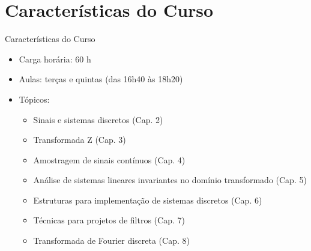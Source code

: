 \documentclass[
size=17pt,
paper=smartboard,
mode=present,
display=slidesnotes,
style=sailor,
nopagebreaks,
blackslide,
fleqn]{powerdot}
\begin{document}
   \section[ slide = false ]{Características do Curso}
      \begin{slide}[toc=]{Características do Curso}
         \begin{itemize}
            \item Carga horária: 60 h
            \item Aulas: terças e quintas (das 16h40 às 18h20)
            \item Tópicos:
            \begin{itemize}
               \item Sinais e sistemas discretos (Cap. 2)
               \item Transformada Z (Cap. 3)
               \item Amostragem de sinais contínuos (Cap. 4)
               \item Análise de sistemas lineares invariantes no domínio transformado (Cap. 5)
               \item Estruturas para implementação de sistemas discretos (Cap. 6)
               \item Técnicas para projetos de filtros (Cap. 7)
               \item Transformada de Fourier discreta (Cap. 8)
            \end{itemize}
         \end{itemize}         
      \end{slide}
      
%   
\end{document}

